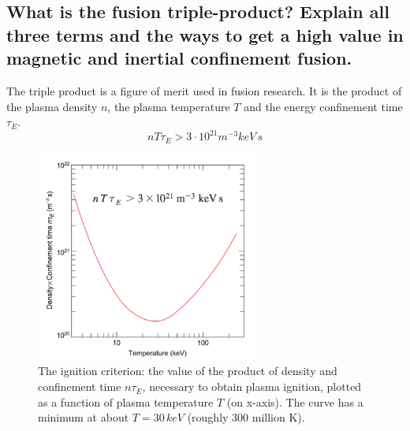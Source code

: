 \subsection{What is the fusion triple-product? Explain all three terms and the ways to get a high value in magnetic and inertial confinement fusion.}
\begin{multisolutionblock}
The triple product is a figure of merit used in fusion research. It is the product of the plasma density $n$, the plasma temperature $T$ and the energy confinement time $\tau_E$.\\
\begin{equation}
    nT\tau_E > 3 \cdot 10^{21} m^{-3}keV \, s
\end{equation}
\begin{figure}[H]
    \centering
    \includegraphics[width=0.65\textwidth]{chapters/fig/4_triple_product.png}
    \caption{The ignition criterion: the value of the product of density and confinement time $n\tau_E$, necessary to obtain plasma ignition, plotted as a function of plasma temperature $T$ (on x-axis). The curve has a minimum at about $T = 30 \,keV$ (roughly $300$ million K).}
    \label{fig:4_triple_product}
\end{figure}


\end{multisolutionblock}
